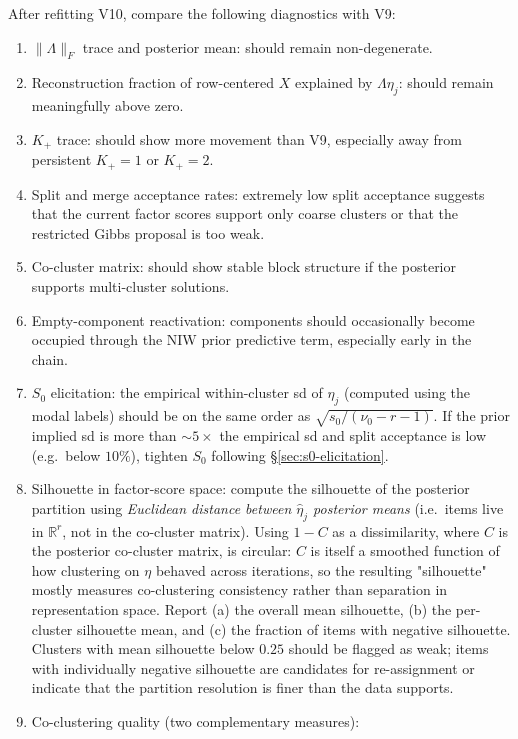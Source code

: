 \documentclass[11pt]{article}
\begin{document}
After refitting V10, compare the following diagnostics with V9:
\begin{enumerate}[leftmargin=2em]
    \item $\|\Lambda\|_F$ trace and posterior mean: should remain non-degenerate.
    \item Reconstruction fraction of row-centered $X$ explained by
    $\Lambda\eta_j$: should remain meaningfully above zero.
    \item $K_+$ trace: should show more movement than V9, especially away
    from persistent $K_+=1$ or $K_+=2$.
    \item Split and merge acceptance rates: extremely low split acceptance
    suggests that the current factor scores support only coarse clusters or
    that the restricted Gibbs proposal is too weak.
    \item Co-cluster matrix: should show stable block structure if the
    posterior supports multi-cluster solutions.
    \item Empty-component reactivation: components should occasionally become
    occupied through the NIW prior predictive term, especially early in the
    chain.
    \item $S_0$ elicitation: the empirical within-cluster sd of $\eta_j$
    (computed using the modal labels) should be on the same order as
    $\sqrt{s_0/(\nu_0-r-1)}$.  If the prior implied sd is more than
    $\sim 5\times$ the empirical sd and split acceptance is low (e.g.\
    below $10\%$), tighten $S_0$ following \S\ref{sec:s0-elicitation}.
    \item Silhouette in factor-score space: compute the silhouette of the
    posterior partition using \emph{Euclidean distance between $\hat\eta_j$
    posterior means} (i.e.\ items live in $\mathbb R^r$, not in the
    co-cluster matrix).  Using $1-C$ as a dissimilarity, where $C$ is the
    posterior co-cluster matrix, is circular: $C$ is itself a smoothed
    function of how clustering on $\eta$ behaved across iterations, so
    the resulting "silhouette" mostly measures co-clustering consistency
    rather than separation in representation space.  Report (a) the
    overall mean silhouette, (b) the per-cluster silhouette mean, and
    (c) the fraction of items with negative silhouette.  Clusters with
    mean silhouette below $0.25$ should be flagged as weak; items with
    individually negative silhouette are candidates for re-assignment or
    indicate that the partition resolution is finer than the data
    supports.
    \item Co-clustering quality (two complementary measures):

\end{enumerate}
\end{document}
